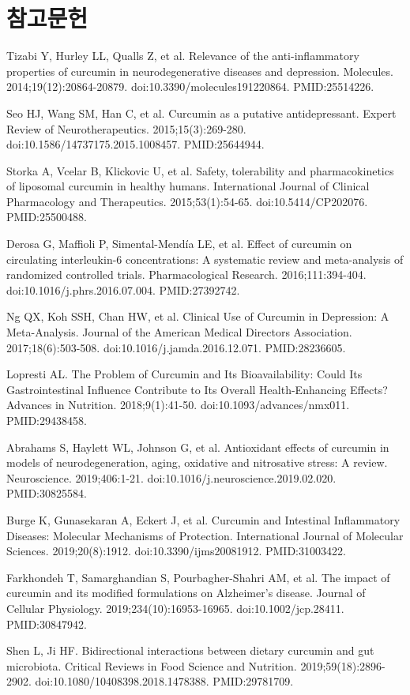 \documentclass[11pt,oneside]{book}
\newcommand{\refstart}{\par\begingroup\footnotesize\setlength{\parskip}{2.5pt}\raggedright}
\newcommand{\reff}[2]{\par\hangindent=7mm\hangafter=1\noindent[#1]\hspace{2mm}#2\par}
\begin{document}
\section*{참고문헌}
\refstart
\reff{1}{Tizabi Y, Hurley LL, Qualls Z, et al. Relevance of the anti-inflammatory properties of curcumin in neurodegenerative diseases and depression. Molecules. 2014;19(12):20864-20879. doi:10.3390/molecules191220864. PMID:25514226.}
\reff{2}{Seo HJ, Wang SM, Han C, et al. Curcumin as a putative antidepressant. Expert Review of Neurotherapeutics. 2015;15(3):269-280. doi:10.1586/14737175.2015.1008457. PMID:25644944.}
\reff{3}{Storka A, Vcelar B, Klickovic U, et al. Safety, tolerability and pharmacokinetics of liposomal curcumin in healthy humans. International Journal of Clinical Pharmacology and Therapeutics. 2015;53(1):54-65. doi:10.5414/CP202076. PMID:25500488.}
\reff{4}{Derosa G, Maffioli P, Simental-Mendía LE, et al. Effect of curcumin on circulating interleukin-6 concentrations: A systematic review and meta-analysis of randomized controlled trials. Pharmacological Research. 2016;111:394-404. doi:10.1016/j.phrs.2016.07.004. PMID:27392742.}
\reff{5}{Ng QX, Koh SSH, Chan HW, et al. Clinical Use of Curcumin in Depression: A Meta-Analysis. Journal of the American Medical Directors Association. 2017;18(6):503-508. doi:10.1016/j.jamda.2016.12.071. PMID:28236605.}
\reff{6}{Lopresti AL. The Problem of Curcumin and Its Bioavailability: Could Its Gastrointestinal Influence Contribute to Its Overall Health-Enhancing Effects? Advances in Nutrition. 2018;9(1):41-50. doi:10.1093/advances/nmx011. PMID:29438458.}
\reff{7}{Abrahams S, Haylett WL, Johnson G, et al. Antioxidant effects of curcumin in models of neurodegeneration, aging, oxidative and nitrosative stress: A review. Neuroscience. 2019;406:1-21. doi:10.1016/j.neuroscience.2019.02.020. PMID:30825584.}
\reff{8}{Burge K, Gunasekaran A, Eckert J, et al. Curcumin and Intestinal Inflammatory Diseases: Molecular Mechanisms of Protection. International Journal of Molecular Sciences. 2019;20(8):1912. doi:10.3390/ijms20081912. PMID:31003422.}
\reff{9}{Farkhondeh T, Samarghandian S, Pourbagher-Shahri AM, et al. The impact of curcumin and its modified formulations on Alzheimer's disease. Journal of Cellular Physiology. 2019;234(10):16953-16965. doi:10.1002/jcp.28411. PMID:30847942.}
\reff{10}{Shen L, Ji HF. Bidirectional interactions between dietary curcumin and gut microbiota. Critical Reviews in Food Science and Nutrition. 2019;59(18):2896-2902. doi:10.1080/10408398.2018.1478388. PMID:29781709.}
\end{document}
